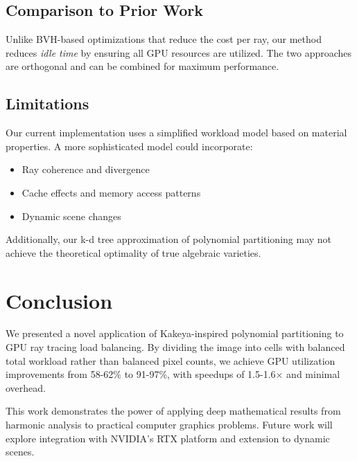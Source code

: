 \documentclass[11pt,a4paper]{article}
\begin{document}
\subsection{Comparison to Prior Work}

Unlike BVH-based optimizations that reduce the cost per ray, our method reduces \textit{idle time} by ensuring all GPU resources are utilized. The two approaches are orthogonal and can be combined for maximum performance.

\subsection{Limitations}

Our current implementation uses a simplified workload model based on material properties. A more sophisticated model could incorporate:
\begin{itemize}
    \item Ray coherence and divergence
    \item Cache effects and memory access patterns
    \item Dynamic scene changes
\end{itemize}

Additionally, our k-d tree approximation of polynomial partitioning may not achieve the theoretical optimality of true algebraic varieties.

\section{Conclusion}

We presented a novel application of Kakeya-inspired polynomial partitioning to GPU ray tracing load balancing. By dividing the image into cells with balanced total workload rather than balanced pixel counts, we achieve GPU utilization improvements from 58-62\% to 91-97\%, with speedups of 1.5-1.6× and minimal overhead.

This work demonstrates the power of applying deep mathematical results from harmonic analysis to practical computer graphics problems. Future work will explore integration with NVIDIA's RTX platform and extension to dynamic scenes.
\end{document}
